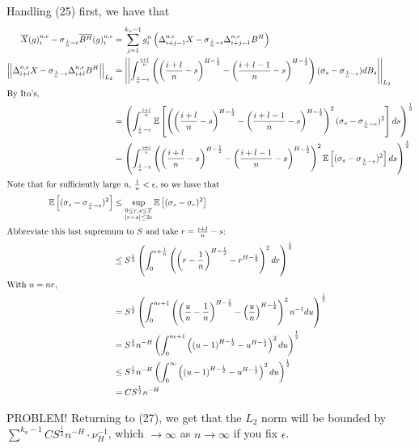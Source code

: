 \documentclass[12pt,letterpaper]{article}
\theoremstyle{lemma}
\theoremstyle{definition}
\newcommand{\E}{\mathbb{E}}
\newcommand{\lpnorm}[2]{\left|\left|{#1}\right|\right|_{L_{#2}}}
\begin{document}
Handling (25) first, we have that
\begin{align}
  \overline{X}(g)^{n,\epsilon}_i - \sigma_{\frac{i}{n}-\epsilon}\overline{B^H}(g)^{n,\epsilon}_i &= \sum_{j=1}^{k_n-1}g^n_i\left( \Delta_{i+j-1}^{n,\epsilon}X - \sigma_{\frac{i}{n}-\epsilon}\Delta_{i+j-1}^{n,\epsilon}B^H\right) \\
    \lpnorm{\Delta_{i+l}^{n,\epsilon}X - \sigma_{\frac{i}{n}-\epsilon}\Delta_{i+l}^{n,\epsilon}B^H}{2} &= \lpnorm{\int_{\frac{i}{n} - \epsilon}^{\frac{i+l}{n}}\left( \left( \frac{i+l}{n} - s \right)^{H-\frac{1}{2}} - \left( \frac{i+l-1}{n} - s \right)^{H-\frac{1}{2}}\right) (\sigma_s - \sigma_{\frac{i}{n} - \epsilon})dB_s}{2} \\
    \intertext{By Ito's,}
                                                                              &= \left(\int_{\frac{i}{n} - \epsilon}^{\frac{i+l}{n}}\E\left[\left( \left( \frac{i+l}{n} - s \right)^{H-\frac{1}{2}} - \left( \frac{i+l-1}{n} - s \right)^{H-\frac{1}{2}}\right)^2 (\sigma_s - \sigma_{\frac{i}{n} - \epsilon})^2\right]ds\right)^{\frac{1}{2}} \\
                                                                              &= \left(\int_{\frac{i}{n} - \epsilon}^{\frac{i+l}{n}}\left( \left( \frac{i+l}{n} - s \right)^{H-\frac{1}{2}} - \left( \frac{i+l-1}{n} - s \right)^{H-\frac{1}{2}}\right)^2 \E\left[(\sigma_s - \sigma_{\frac{i}{n} - \epsilon})^2\right]ds\right)^{\frac{1}{2}} \\
                                                                              \intertext{Note that for sufficiently large \(n\), \(\frac{l}{n} < \epsilon\), so we have that}
    \E\left[(\sigma_s - \sigma_{\frac{i}{n} - \epsilon})^2\right] &\leq \sup_{\substack{0 \leq r,s \leq T \\ |r-s| \leq 2\epsilon}}\E\left[(\sigma_s - \sigma_r)^2\right] \\
    \intertext{Abbreviate this last supremum to \(S\) and take \(r = \frac{i+l}{n}-s\):}
                                                                  &\leq S^{\frac{1}{2}}\left(\int^{\epsilon+\frac{l}{n}}_0\left(\left(r - \frac{1}{n}\right)^{H-\frac{1}{2}} -  r^{H-\frac{1}{2}}\right)^2 dr\right)^{\frac{1}{2}} \\
                                                                  \intertext{With \(u = nr\),}
                                                                  &= S^{\frac{1}{2}}\left(\int^{n\epsilon+1}_0\left(\left(\frac{u}{n} - \frac{1}{n}\right)^{H-\frac{1}{2}} -  \left( \frac{u}{n} \right)^{H-\frac{1}{2}}\right)^2 n^{-1}du\right)^{\frac{1}{2}} \\
                                                                  &= S^{\frac{1}{2}}n^{-H}\left(\int^{n\epsilon+1}_0\left(\left(u - 1\right)^{H-\frac{1}{2}} -  u^{H-\frac{1}{2}}\right)^2 du\right)^{\frac{1}{2}} \\
                                                                  &\leq S^{\frac{1}{2}}n^{-H}\left(\int^{\infty}_0\left(\left(u - 1\right)^{H-\frac{1}{2}} -  u^{H-\frac{1}{2}}\right)^2 du\right)^{\frac{1}{2}} \\
                                                                  &= CS^{\frac{1}{2}}n^{-H}
\end{align}

PROBLEM! Returning to (27), we get that the \(L_2\) norm will be bounded by \(\sum^{k_n - 1} CS^{\frac{1}{2}}n^{-H} \cdot \nu_H^{-1}\), which \(\rightarrow \infty\) as \(n \rightarrow \infty\) if you fix \(\epsilon\).
\end{document}
